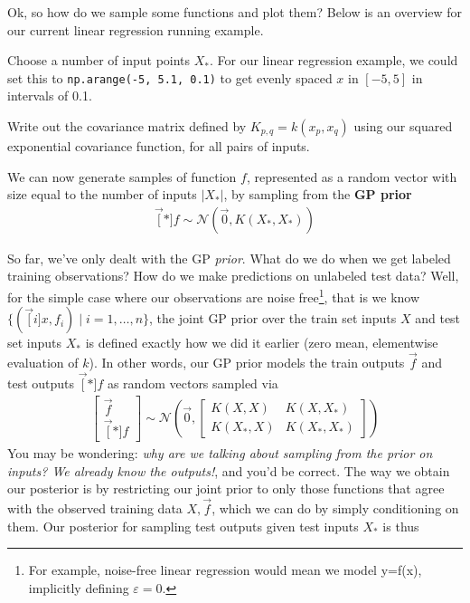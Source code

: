 \documentclass[11pt]{article}
\begin{document}
Ok, so how do we sample some functions and plot them? Below is an overview for our current linear regression running example.
\begin{compactenum}
	\item Choose a number of input points $X_*$. For our linear regression example, we could set this to \texttt{np.arange(-5, 5.1, 0.1)} to get evenly spaced $x$ in $[-5, 5]$ in intervals of 0.1. 
	
	\item Write out the covariance matrix defined by $K_{p, q} = k(x_p, x_q)$ using our squared exponential covariance function, for all pairs of inputs. 
	
	\item We can now generate samples of function $f$, represented as a random vector with size equal to the number of inputs $|X_*|$, by sampling from the \textbf{GP prior}
	\begin{align}
		\vec[*]{f} \sim \mathcal{N}(\vec 0, K(X_*, X_*))
	\end{align}
\end{compactenum}
So far, we've only dealt with the GP \textit{prior}. What do we do when we get labeled training observations? How do we make predictions on unlabeled test data? Well, for the simple case where our observations are noise free\footnote{For example, noise-free linear regression would mean we model y=f(x), implicitly defining $\varepsilon=0$.}, that is we know $\{ (\vec[i]{x}, f_i) \mid i = 1,\ldots,n \}$, the joint GP prior over the train set inputs $X$ and test set inputs $X_*$ is defined exactly how we did it earlier (zero mean, elementwise evaluation of $k$). In other words, our GP prior models the train outputs $\vec f$ and test outputs $\vec[*]{f}$ as random vectors sampled via
\begin{align}
	\begin{bmatrix}
		\vec f \\
		\vec[*]{f}
	\end{bmatrix}
	\sim
	\mathcal{N}\left(
		\vec 0, 
		\begin{bmatrix}
			K(X, X) & K(X, X_*) \\
			K(X_*, X) & K(X_*, X_*)
		\end{bmatrix}
	\right)
\end{align} 
You may be wondering: \textit{why are we talking about sampling from the prior on inputs? We already know the outputs!}, and you'd be correct. The way we obtain our posterior is by restricting our joint prior to only those functions that agree with the observed training data $X, \vec f$, which we can do by simply conditioning on them. Our posterior for sampling test outputs given test inputs $X_*$ is thus
\end{document}
